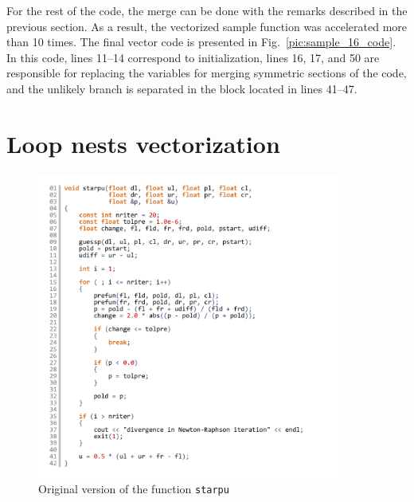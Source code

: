 \documentclass[utf8,english]{psta}%
\begin{document}
For the rest of the code, the merge can be done with the remarks described in the previous section.
As a result, the vectorized sample function was accelerated more than 10 times.
The final vector code is presented in Fig.~\ref{pic:sample_16_code}.
In this code, lines 11–14 correspond to initialization, lines 16, 17, and 50 are responsible for replacing the variables for merging symmetric sections of the code, and the unlikely branch is separated in the block located in lines 41–47.

\section{Loop nests vectorization}

\begin{figure}
\includegraphics[width=10cm]{pics/pic_starpu_code}
\caption{Original version of the function \texttt{starpu}}
\label{pic:starpu_code}
\end{figure}
\end{document}
